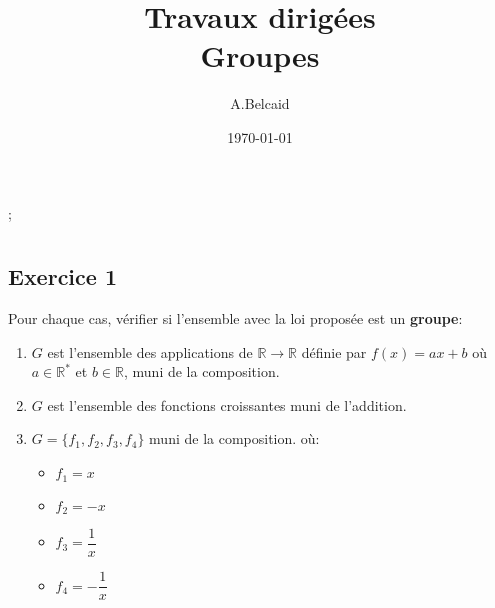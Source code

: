 \documentclass{report}
\title{\Huge{Travaux dirigées}\\ Groupes}
\author{\huge{A.Belcaid}}
\date{\today}
\begin{document}
\maketitle
\tableofcontents
\pagebreak
\newcommand{\Nn}{\mathbb{N}}
\newcommand{\Rr}{\mathbb{R}};
\newcommand{\Zz}{\mathbb{Z}}
\newcommand{\Qq}{\mathbb{Q}}




\chapter{}

\section{Exercice 1}
\qs{}
{
Pour chaque cas, vérifier si l'ensemble avec la loi proposée est un
\textbf{groupe}:

\begin{enumerate}
  \item $G$ est l'ensemble des applications de $\Rr\longrightarrow\Rr$ définie
    par $f(x) = ax + b$ où $a\in \Rr^{*}$ et $b\in \Rr$, muni de la composition.

  \item $G$ est l'ensemble des fonctions croissantes muni de l'addition.
  \item $G = \{f_1, f_2, f_3, f_4\}$ muni de la composition.
    où:\\
    \begin{itemize}
      \item $f_1 = x$\hspace*{8pt}
      \item $f_2 = -x$\hspace*{8pt}
      \item $f_3 = \dfrac{1}{x}$\hspace*{8pt}
      \item $f_4 = -\dfrac{1}{x}$
    \end{itemize}
\end{enumerate}
}
\end{document}
